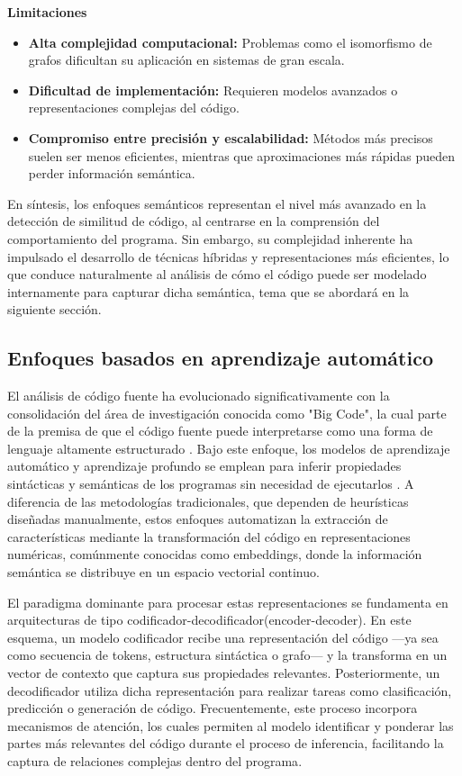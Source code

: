 \textbf{Limitaciones}
\begin{itemize}
    \item \textbf{Alta complejidad computacional:} Problemas como el isomorfismo de grafos dificultan su aplicación en sistemas de gran escala.
    
    \item \textbf{Dificultad de implementación:} Requieren modelos avanzados o representaciones complejas del código.
    
    \item \textbf{Compromiso entre precisión y escalabilidad:} Métodos más precisos suelen ser menos eficientes, mientras que aproximaciones más rápidas pueden perder información semántica.
\end{itemize}

En síntesis, los enfoques semánticos representan el nivel más avanzado en la detección de similitud de código, al centrarse en la comprensión del comportamiento del programa. Sin embargo, su complejidad inherente ha impulsado el desarrollo de técnicas híbridas y representaciones más eficientes, lo que conduce naturalmente al análisis de cómo el código puede ser modelado internamente para capturar dicha semántica, tema que se abordará en la siguiente sección.
\subsection{Enfoques basados en aprendizaje automático}

El análisis de código fuente ha evolucionado significativamente con la consolidación del área de investigación conocida como "Big Code", la cual parte de la premisa de que el código fuente puede interpretarse como una forma de lenguaje altamente estructurado \cite{Le2021DeepLearning}. Bajo este enfoque, los modelos de aprendizaje automático y aprendizaje profundo se emplean para inferir propiedades sintácticas y semánticas de los programas sin necesidad de ejecutarlos \cite{Alon2018Code2Vec}. A diferencia de las metodologías tradicionales, que dependen de heurísticas diseñadas manualmente, estos enfoques automatizan la extracción de características mediante la transformación del código en representaciones numéricas, comúnmente conocidas como embeddings, donde la información semántica se distribuye en un espacio vectorial continuo\cite{Le2021DeepLearning}.

El paradigma dominante para procesar estas representaciones se fundamenta en arquitecturas de tipo codificador-decodificador(encoder-decoder). En este esquema, un modelo codificador recibe una representación del código —ya sea como secuencia de tokens, estructura sintáctica o grafo— y la transforma en un vector de contexto que captura sus propiedades relevantes. Posteriormente, un decodificador utiliza dicha representación para realizar tareas como clasificación, predicción o generación de código\cite{Le2021DeepLearning}. Frecuentemente, este proceso incorpora mecanismos de atención, los cuales permiten al modelo identificar y ponderar las partes más relevantes del código durante el proceso de inferencia, facilitando la captura de relaciones complejas dentro del programa\cite{Alon2018Code2Vec}.

